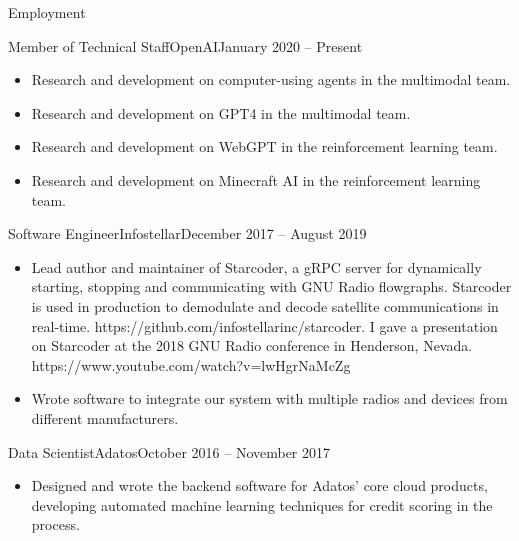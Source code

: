 \documentclass[]{mcdowellcv}
\begin{document}
	\makeheader
	
	\begin{cvsection}{Employment}
	    \begin{cvsubsection}{Member of Technical Staff}{OpenAI}{January 2020 -- Present}
			\begin{itemize}
                    \item Research and development on computer-using agents in the multimodal team.
                    \item Research and development on GPT4 in the multimodal team.
				\item Research and development on WebGPT in the reinforcement learning team.
                    \item Research and development on Minecraft AI in the reinforcement learning team.
			\end{itemize}
		\end{cvsubsection}
	
		\begin{cvsubsection}{Software Engineer}{Infostellar}{December 2017 -- August 2019}
			\begin{itemize}
				\item Lead author and maintainer of Starcoder, a gRPC server for dynamically starting, stopping and communicating with GNU Radio flowgraphs. Starcoder is used in production to demodulate and decode satellite communications in real-time. https://github.com/infostellarinc/starcoder. I gave a presentation on Starcoder at the 2018 GNU Radio conference in Henderson, Nevada. https://www.youtube.com/watch?v=lwHgrNaMcZg
				\item Wrote software to integrate our system with multiple radios and devices from different manufacturers.
			\end{itemize}
		\end{cvsubsection}
		
		\begin{cvsubsection}{Data Scientist}{Adatos}{October 2016 -- November 2017}	
			\begin{itemize}
				\item Designed and wrote the backend software for Adatos' core cloud products, developing automated machine learning techniques for credit scoring in the process.
			\end{itemize}
		\end{cvsubsection}
	\end{cvsection}
	
\end{document}
